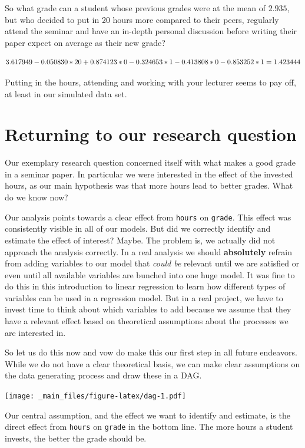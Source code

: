 \documentclass[
]{book}
\begin{document}
So what grade can a student whose previous grades were at the mean of \(2.935\),
but who decided to put in 20 hours more compared to their peers, regularly
attend the seminar and have an in-depth personal discussion before writing their
paper expect on average as their new grade?

\[3.617949 - 0.050830 * 20 + 0.874123 * 0 - 0.324653 * 1 - 0.413808 * 0 - 0.853252 * 1 
\\ = 1.423444\]

Putting in the hours, attending and working with your lecturer seems to pay off,
at least in our simulated data set.

\hypertarget{returning-to-our-research-question}{%
\section{Returning to our research question}\label{returning-to-our-research-question}}

Our exemplary research question concerned itself with what makes a good grade in
a seminar paper. In particular we were interested in the effect of the invested
hours, as our main hypothesis was that more hours lead to better grades. What do
we know now?

Our analysis points towards a clear effect from \texttt{hours} on \texttt{grade}. This effect
was consistently visible in all of our models. But did we correctly identify
and estimate the effect of interest? Maybe. The problem is, we actually did not
approach the analysis correctly. In a real analysis we should \textbf{absolutely}
refrain from adding variables to our model that \emph{could be} relevant until we are
satisfied or even until all available variables are bunched into one huge model.
It was fine to do this in this introduction to linear regression to learn how
different types of variables can be used in a regression model. But in a real
project, we have to invest time to think about which variables to add because we
assume that they have a relevant effect based on theoretical assumptions about
the processes we are interested in.

So let us do this now and vow do make this our first step in all future
endeavors. While we do not have a clear theoretical basis, we can make clear
assumptions on the data generating process and draw these in a DAG.

\texttt{[image: \_main\_files/figure-latex/dag-1.pdf]}

Our central assumption, and the effect we want to identify and estimate, is the
direct effect from \texttt{hours} on \texttt{grade} in the bottom line. The more hours a
student invests, the better the grade should be.
\end{document}
